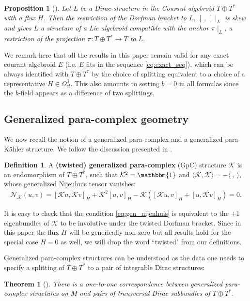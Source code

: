 \documentclass{article}
\newcommand{\TT}{{T\oplus T^*}}
\newcommand{\KK}{\mathcal{K}}
\newcommand{\id}{\mathbbm{1}}
\newcommand{\la}{\langle}
\newcommand{\ra}{\rangle}
\newcommand{\lara}{\la\ ,\ \ra}
\newcommand{\brac}{[\ ,\ ]}
\newtheorem{proposition}[theorem]{Proposition}
\newtheorem*{theorem*}{Theorem}
\theoremstyle{definition}
\newtheorem{Def}[theorem]{Definition}
\theoremstyle{remark}
\begin{document}
\begin{proposition}[\cite{courant1990dirac}]\label{prop:dirac_Liealg}
Let $L$ be a Dirac structure in the Courant algebroid $\TT$ with a flux $H$. Then the restriction of the Dorfman bracket to $L$, $\brac\mid_L$ is skew and gives $L$ a structure of a Lie algebroid compatible with the anchor $\pi\mid_L$, a restriction of the projection $\pi:\TT\rightarrow T$ to $L$.
\end{proposition} 
 
 
We remark here that all the results in this paper remain valid for any exact courant algebroid $E$ (i.e. $E$ fits in the sequence \eqref{eq:exact_seq}), which can be always identified with $\TT$ by the choice of splitting equivalent to a choice of a representative $H\in\Omega^3_{cl}$. This also amounts to setting $b=0$ in all formulas since the $b$-field appears as a difference of two splittings.

\subsection{Generalized para-complex geometry}
We now recall the notion of a generalized para-complex \cite{wade2004dirac,Zabzine:2006uz,Hu:2019zro} and a generalized para-K\"ahler \cite{Hu:2019zro} structure. We follow the discussion presented in \cite{Hu:2019zro}.

\begin{Def}
A \textbf{(twisted) generalized para-complex} (GpC) structure $\KK$ is an endomorphism of $\TT$, such that $\KK^2=\id$ and $\la\KK,\KK\ra=-\lara$, whose generalized Nijenhuis tensor vanishes:
\begin{align}\label{eq:gen_nijenhuis}
\mathcal{N}_\KK(u,v)=[\KK u,\KK v]_H+\KK^2[ u,v]_H-\KK([\KK u,v]_H+[ u,\KK v]_H)=0.
\end{align}
\end{Def}
It is easy to check that the condition \eqref{eq:gen_nijenhuis} is equivalent to the $\pm 1$ eigenbundles of $\KK$ to be involutive under the twisted Dorfman bracket. Since in this paper the flux $H$ will be generically non-zero but all results hold for the special case $H=0$ as well, we will drop the word ``twisted" from our definitions.

Generalized para-complex structures can be understood as the data one needs to specify a splitting of $\TT$ to a pair of integrable Dirac structures:

\begin{theorem*}[\cite{wade2004dirac}]\label{thm:pairofdirac}
There is a one-to-one correspondence between generalized para-complex structures on $M$ and pairs of transversal Dirac subbundles of $\TT$.
\end{theorem*}
\end{document}
